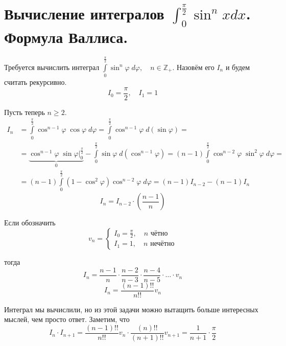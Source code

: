 \documentclass[../main.tex]{subfiles}
\begin{document}
\newpage
\section{Вычисление интегралов \( \int_{ 0}^{ \frac{ \pi}{ 2}} \sin^n xdx\). Формула Валлиса.}
Требуется вычислить интеграл \( \displaystyle\int\limits_{ 0}^{ \frac{ \pi}{ 2}} \sin^n \varphi \;d \varphi ,\quad n \in \mathbb{Z}_+\). Назовём его \( I_n\) и будем считать рекурсивно. 
\[ I_0= \dfrac{ \pi}{ 2} ,\quad I_1=1\]

Пусть теперь \( n \geq 2\).
\begin{equation*}
    \begin{aligned}
        I_n&= \displaystyle\int\limits_{ 0}^{ \frac{ \pi}{ 2}  } \cos ^{n-1} \varphi \; \cos \varphi \; d \varphi = \displaystyle\int\limits_{ 0}^{ \frac{ \pi}{ 2}  } \cos ^{n-1} \varphi \; d\left( \sin \varphi \right)=\\
        &=\underbrace{\cos^{n-1} \varphi \; \sin \varphi \bigg|_0^{ \frac{ \pi}{ 2}}}_0 - \displaystyle\int\limits_{ 0}^{ \frac{ \pi}{ 2}  } \sin \varphi \; d\left( \cos ^{n-1} \varphi \right)=\left( n-1\right) \displaystyle\int\limits_{ 0}^{ \frac{ \pi}{ 2}  } \cos ^{n-2} \varphi \; \sin^2 \varphi \;d \varphi =\\ 
        &=\left( n-1\right) \displaystyle\int\limits_{ 0}^{ \frac{ \pi}{ 2}  } \left( 1- \cos^2 \varphi \right)\cos^{n-2} \varphi \; d \varphi = \left( n-1\right) I_{n-2} - \left( n-1\right)I_n
    \end{aligned}
\end{equation*}
\[ \boxed{I_n= I_{n-2} \cdot \left( \dfrac{ n-1}{ n} \right)}\]

Если обозначить
\begin{equation*}
    v_n=
    \begin{cases}
        I_0= \frac{ \pi}{ 2},\quad n\text{ чётно}\\ 
        I_1=1,\quad n\text{ нечётно} 
    \end{cases}
\end{equation*}

тогда 
\[ I_n= \dfrac{ n-1}{ n} \cdot \dfrac{ n-2}{ n-3} \cdot \dfrac{ n-4}{ n-5} \cdot \ldots \cdot v_n\]
\[ \boxed{I_n= \dfrac{ \left(n-1\right)!!}{ n!!} v_n}\]

Интеграл мы вычислили, но из этой задачи можно вытащить больше интересных мыслей, чем просто ответ. Заметим, что
\[ I_n \cdot I_{n+1}= \dfrac{ \left(n-1\right)!!}{ n!!} v_n \cdot \dfrac{ \left(n\right)!!}{ \left( n+1\right)!!} v_{n+1} =  \dfrac{ 1}{ n+1} \cdot  \dfrac{ \pi}{ 2}  \]
\end{document}
